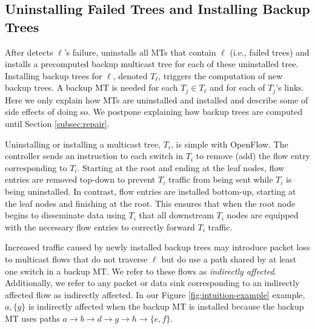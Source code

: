 

















\subsection{Uninstalling Failed Trees and Installing Backup Trees}
\label{subsec:uninstall-install}

After \fl detects $\ell$'s failure, \mdr uninstalls all MTs that contain $\ell$ (i.e., failed trees) and installs a precomputed backup multicast tree for each of these uninstalled tree. Installing 
backup trees for $\ell$, denoted $T_{\ell}$, triggers the computation of new backup trees.  A backup MT is needed for each $T_j \in T_{\ell}$ and for each of $T_j$'s links.
Here we only explain how MTs are uninstalled and installed and describe some of side effects of doing so. We postpone explaining how backup trees are computed until Section \ref{subsec:repair}.

Uninstalling or installing a multicast tree, $T_i$, is simple with OpenFlow.  The controller sends an instruction to each switch in $T_i$ to remove (add) the flow entry corresponding to $T_i$.
Starting at the root and ending at the leaf nodes, flow entries are removed top-down to prevent $T_i$ traffic from being sent while $T_i$ is being uninstalled. 
In contrast, flow entries are installed bottom-up, starting at the leaf
nodes and finishing at the root.  This ensures that when the root node begins to disseminate data using $T_i$ that all downstream $T_i$ nodes are equipped with the necessary flow entries
to correctly forward $T_i$ traffic.

Increased traffic caused by newly installed backup trees may introduce packet loss to multicast flows that do not traverse $\ell$ but do use a path shared by at
least one switch in a backup MT.  
We refer to these flows as \emph{indirectly affected}. Additionally, we refer to any packet or data sink corresponding to an indirectly affected flow as indirectly affected.
In our Figure \ref{fig:intuition-example} example, $a,\{g\}$ is indirectly affected when the backup MT is installed because the backup MT uses paths 
$a \rightarrow b \rightarrow d \rightarrow g \rightarrow h \rightarrow \{e,f\}$. 

